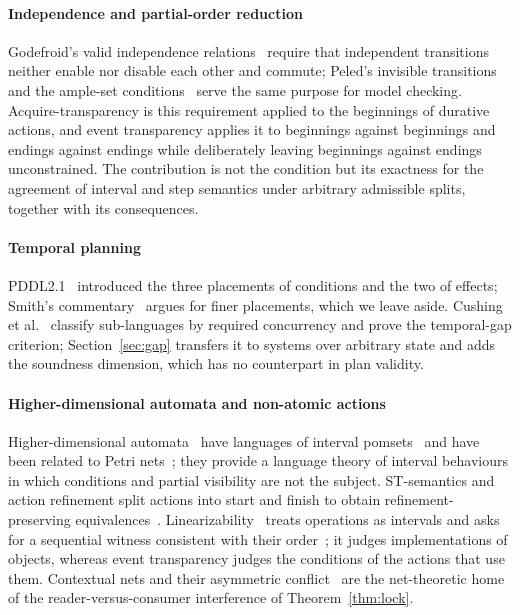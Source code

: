 \documentclass[preprint,12pt]{elsarticle}
\theoremstyle{plain}
\theoremstyle{definition}
\begin{document}
\paragraph{Independence and partial-order reduction}
Godefroid's valid independence relations~\cite{Godefroid1996} require that independent transitions neither enable nor disable each other and commute; Peled's invisible transitions and the ample-set conditions~\cite{Peled1993} serve the same purpose for model checking. Acquire-transparency is this requirement applied to the beginnings of durative actions, and event transparency applies it to beginnings against beginnings and endings against endings while deliberately leaving beginnings against endings unconstrained. The contribution is not the condition but its exactness for the agreement of interval and step semantics under arbitrary admissible splits, together with its consequences.

\paragraph{Temporal planning}
PDDL2.1~\cite{FoxLong2003} introduced the three placements of conditions and the two of effects; Smith's commentary~\cite{Smith2003} argues for finer placements, which we leave aside. Cushing et al.~\cite{CushingEtAl2007} classify sub-languages by required concurrency and prove the temporal-gap criterion; Section~\ref{sec:gap} transfers it to systems over arbitrary state and adds the soundness dimension, which has no counterpart in plan validity.

\paragraph{Higher-dimensional automata and non-atomic actions}
Higher-dimensional automata~\cite{vanGlabbeek2006HDA} have languages of interval pomsets~\cite{FahrenbergJohansenStruthZiemianski2021,AmraneEtAl2024ipomsets} and have been related to Petri nets~\cite{AmraneEtAl2025PNHDA}; they provide a language theory of interval behaviours in which conditions and partial visibility are not the subject. ST-semantics and action refinement split actions into start and finish to obtain refinement-preserving equivalences~\cite{vanGlabbeekGoltz2001,vanGlabbeek2015SPB}. Linearizability~\cite{HerlihyWing1990} treats operations as intervals and asks for a sequential witness consistent with their order~\cite{BouajjaniEmmiEneaHamza2015,KhyzhaDoddsGotsmanParkinson2017}; it judges implementations of objects, whereas event transparency judges the conditions of the actions that use them. Contextual nets and their asymmetric conflict~\cite{MontanariRossi1995,BaldanCorradiniMontanari2001,Vogler2002} are the net-theoretic home of the reader-versus-consumer interference of Theorem~\ref{thm:lock}.
\end{document}
